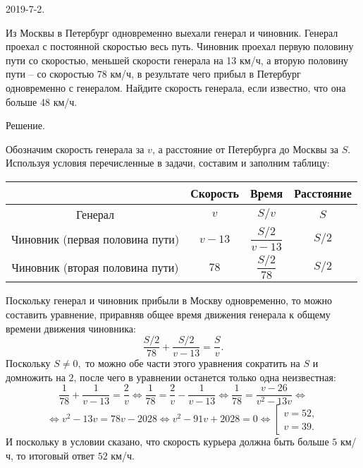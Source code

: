 

2019-7-2.

Из Москвы в Петербург одновременно выехали генерал и чиновник. Генерал проехал с постоянной скоростью весь путь. Чиновник проехал первую половину пути со скоростью, меньшей скорости генерала на 13
км/ч, а вторую половину пути – со скоростью 78 км/ч, в результате чего прибыл в Петербург одновременно с
генералом. Найдите скорость генерала, если известно, что она больше 48 км/ч.

Решение.

Обозначим скорость генерала за $v$, а расстояние от Петербурга до Москвы за $S$. Используя условия перечисленные в задачи, составим и заполним таблицу:

\center
\renewcommand\arraystretch{3}
\begin{tabular}{|c|c|c|c|}
\hline
&Скорость& Время & Расстояние\\\hline
Генерал&$v$& $S/v$ & $S$\\\hline
Чиновник (первая половина пути)&$v-13$& $\dfrac{S/2}{v-13}$ & $S/2$\\\hline
Чиновник (вторая половина пути)&$78$& $\dfrac{S/2}{78}$ & $S/2$\\\hline
\end{tabular}
\flushleft
\renewcommand\arraystretch{1.5}

Поскольку генерал и чиновник прибыли в Москву одновременно, то можно составить уравнение, приравняв общее время движения генерала к общему времени движения чиновника:
$$\dfrac{S/2}{78}+\dfrac{S/2}{v-13}=\dfrac{S}{v}.$$
Поскольку $S\neq 0,$ то можно обе части этого уравнения сократить на $S$ и домножить на $2$, после чего в уравнении останется только одна неизвестная:
$$\dfrac{1}{78}+\dfrac{1}{v-13}=\dfrac{2}{v}
\Leftrightarrow \dfrac{1}{78}=\dfrac{2}{v}-\dfrac{1}{v-13} \Leftrightarrow \dfrac{1}{78}=\dfrac{v-26}{v^2-13v}\Leftrightarrow$$
$$\Leftrightarrow v^2-13v = 78v-2028 \Leftrightarrow v^2-91v + 2028=0 \Leftrightarrow\left[\begin{array}{ll}v= 52,\\v=39.\end{array}\right.$$
И поскольку в условии сказано, что скорость курьера должна быть больше $5$ км/ч, то итоговый ответ $52$ км/ч.

